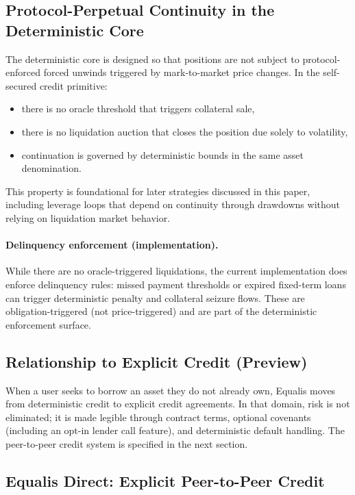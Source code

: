 \documentclass[version=preprint]{iacrcc}
\begin{document}
\subsection{Protocol-Perpetual Continuity in the Deterministic Core}

The deterministic core is designed so that positions are not subject to protocol-enforced forced unwinds triggered by mark-to-market price changes. In the self-secured credit primitive:
\begin{itemize}
  \item there is no oracle threshold that triggers collateral sale,
  \item there is no liquidation auction that closes the position due solely to volatility,
  \item continuation is governed by deterministic bounds in the same asset denomination.
\end{itemize}

This property is foundational for later strategies discussed in this paper, including leverage loops that depend on continuity through drawdowns without relying on liquidation market behavior.

\paragraph{Delinquency enforcement (implementation).}
While there are no oracle-triggered liquidations, the current implementation does enforce delinquency rules: missed payment thresholds or expired fixed-term loans can trigger deterministic penalty and collateral seizure flows. These are obligation-triggered (not price-triggered) and are part of the deterministic enforcement surface.

\subsection{Relationship to Explicit Credit (Preview)}

When a user seeks to borrow an asset they do not already own, Equalis moves from deterministic credit to explicit credit agreements. In that domain, risk is not eliminated; it is made legible through contract terms, optional covenants (including an opt-in lender call feature), and deterministic default handling. The peer-to-peer credit system is specified in the next section.

\subsection{Equalis Direct: Explicit Peer-to-Peer Credit}
\end{document}
